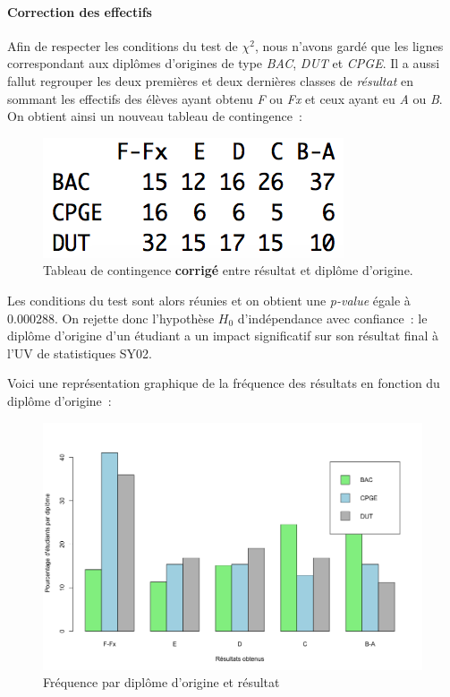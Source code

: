 \documentclass[a4paper,11pt]{report}
\begin{document}
\paragraph{Correction des effectifs}
Afin de respecter les conditions du test de $\chi^2$, nous n'avons gardé que les lignes correspondant aux diplômes d'origines de type \textit{BAC}, \textit{DUT} et \textit{CPGE}. Il a aussi fallut regrouper les deux premières et deux dernières classes de \textit{résultat} en sommant les effectifs des élèves ayant obtenu \textit{F} ou \textit{Fx} et ceux ayant eu \textit{A} ou \textit{B}.\\
On obtient ainsi un nouveau tableau de contingence~:


\begin{figure}[H]
	\centering
	\captionsetup{justification=centering, margin=4cm}
	\includegraphics[width=0.3\linewidth]{img/1-1-2-Contingence-Result-Diplome-Corrigee}
	\caption{\scriptsize Tableau de contingence \textbf{corrigé} entre résultat et diplôme d'origine.}
	\label{fig:tab_effectifs_et_contingence_resultats_diplome_origine_corrigee}
\end{figure}
Les conditions du test sont alors réunies et on obtient une \textit{p-value} égale à $0.000288$. On rejette donc l'hypothèse $H_{0}$ d'indépendance avec confiance~: le diplôme d'origine d'un étudiant a un impact significatif sur son résultat final à l'UV de statistiques SY02.

Voici une représentation graphique de la fréquence des résultats en fonction du diplôme d'origine~:

\begin{figure}[H]
	\centering
	\captionsetup{justification=centering, margin=2cm}
	\includegraphics[width=.4\linewidth]{img/1-1-2-Ratio-resultat-diplome}
	\caption{\scriptsize Fréquence par diplôme d'origine et résultat}
	\label{fig:ratio_resultats_diplome}
\end{figure}
\end{document}
